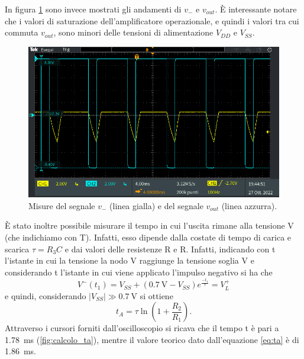 \noindent
In figura \ref{fig:segnale_uscita} sono invece mostrati gli andamenti di $v_{-}$ e $v_{out}$. È interessante notare che i valori di saturazione dell'amplificatore operazionale, e quindi i valori tra cui commuta $v_{out}$, sono minori delle tensioni di alimentazione $V_{DD}$ e $V_{SS}$.
\begin{figure}[h!]
	\centering
	\includegraphics[width=\linewidth]{./ImageFiles/Laboratorio 4/TEK00008.PNG}
	\caption{Misure del segnale $v_{-}$ (linea gialla) e del segnale $v_{out}$ (linea azzurra).}
	\label{fig:segnale_uscita}
\end{figure}

\noindent
\`E stato inoltre possibile misurare il tempo in cui l'uscita rimane alla tensione V (che indichiamo con T). Infatti, esso dipende dalla costate di tempo di carica e scarica $\tau=R_3C$ e dai valori delle resistenze R e R. Infatti, indicando con t l'istante in cui la tensione la nodo V\super{-} raggiunge la tensione soglia V\super{+} e considerando t l'istante in cui viene applicato l'impulso negativo si ha che
\begin{equation}
	V^-(t_1)=V_{SS}+(\SI{0.7}{\volt}-V_{SS})e^{\frac{-t_1}{\tau}}=V_L^+
\end{equation}
e quindi, considerando $|V_{SS}|\gg\SI{0.7}{\volt}$ si ottiene
\begin{equation}
	t_A=\tau\ln\left(1+\frac{R_2}{R_1}\right).
	\label{eq:ta}
\end{equation}
Attraverso i cursori forniti dall'oscilloscopio si ricava che il tempo t è pari a \SI{1.78}{\milli\second} (\Fig\ref{fig:calcolo_ta}), mentre il valore teorico dato dall'equazione \ref{eq:ta} è di \SI{1.86}{\milli\second}.

